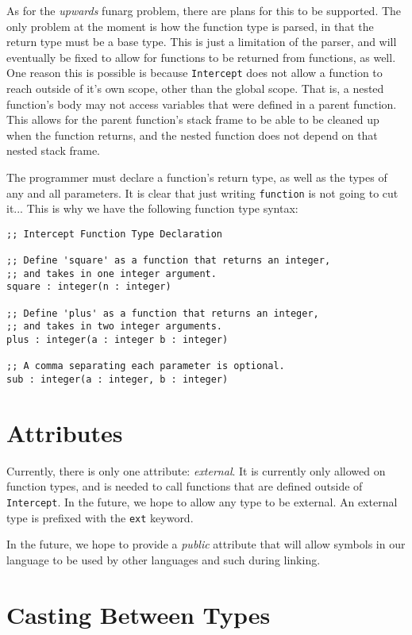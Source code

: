 \documentclass[12pt]{report}
\begin{document}
As for the \emph{upwards} funarg problem, there are plans for this to be supported. The only problem at the moment is how the function type is parsed, in that the return type must be a base type. This is just a limitation of the parser, and will eventually be fixed to allow for functions to be returned from functions, as well. One reason this is possible is because \verb|Intercept| does not allow a function to reach outside of it's own scope, other than the global scope. That is, a nested function's body may not access variables that were defined in a parent function. This allows for the parent function's stack frame to be able to be cleaned up when the function returns, and the nested function does not depend on that nested stack frame.

The programmer must declare a function's return type, as well as the types of any and all parameters. It is clear that just writing \verb|function| is not going to cut it... This is why we have the following function type syntax:
\begin{Verbatim}[samepage=true]
;; Intercept Function Type Declaration

;; Define 'square' as a function that returns an integer,
;; and takes in one integer argument.
square : integer(n : integer)

;; Define 'plus' as a function that returns an integer,
;; and takes in two integer arguments.
plus : integer(a : integer b : integer)

;; A comma separating each parameter is optional.
sub : integer(a : integer, b : integer)
\end{Verbatim}

\section*{Attributes}
\label{subsec:types-attributes}

Currently, there is only one attribute: \emph{external}. It is currently only allowed on function types, and is needed to call functions that are defined outside of \verb|Intercept|. In the future, we hope to allow any type to be external. An external type is prefixed with the \verb|ext| keyword.

In the future, we hope to provide a \emph{public} attribute that will allow symbols in our language to be used by other languages and such during linking.

\section*{Casting Between Types}
\end{document}
